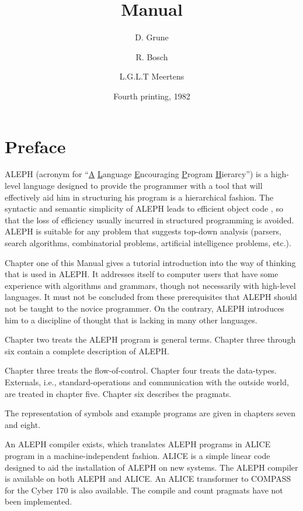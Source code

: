 \documentclass{article}
\title{{\A} Manual}
\author{D. Grune \and R. Bosch \and L.G.L.T Meertens}
\date{Fourth printing, 1982}
\newcommand\A{{\sf ALEPH}}
\newcommand\g[1]{{\sf #1}}
\begin{document}
\maketitle

\setcounter{section}{-1}
\section{Preface}
{\A} (acronym for ``\underline{\sf A} \underline{\sf L}anguage
\underline{\sf E}ncouraging \underline{\sf P}rogram \underline{\sf
H}ierarcy'') is a high-level language designed to provide the programmer
with a tool that will effectively aid him in structuring his program is a
hierarchical fashion. The syntactic and semantic simplicity of {\A} leads to
efficient object code \cite{wichmann77}, so that the loss
of efficiency usually incurred in structured programming is avoided. {\A} is
suitable for any problem that suggests top-down analysis (parsers, search
algorithms, combinatorial problems, artificial intelligence problems, etc.).

Chapter one of this Manual gives a tutorial introduction into the way of
thinking that is used in \A. It addresses itself to computer users that have
some experience with algorithms and grammars, though not necessarily with
high-level languages. It must not be concluded from these prerequisites
that \A{} should not be taught to the novice programmer. On the contrary,
\A{} introduces him to a discipline of thought that is lacking in many other
languages.

Chapter two treats the \A{} program is general terms. Chapter three through
six contain a complete description of \A.

Chapter three treats the flow-of-control. Chapter four treats the data-types.
Externals, i.e., standard-operations and communication with the outside
world, are treated in chapter five. Chapter six describes the pragmats.

The representation of \g{symbols} and example programs are given in chapters 
seven and eight.

An \A{} compiler exists, which translates \A{} programs in {\sf ALICE}
program in a machine-independent fashion. {\sf ALICE}\cite{bohm77} is a
simple linear code designed to aid the installation of \A{} on new systems.
The \A{} compiler is available on both \A{} and {\sf ALICE}. An {\sf ALICE}
transformer to {\sf COMPASS} for the Cyber 170 is also available. The
\g{compile} and \g{count} pragmats have not been implemented.
\end{document}
